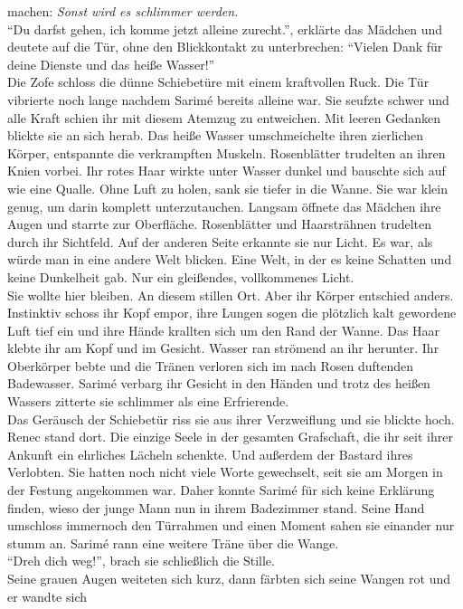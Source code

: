 machen: \textit{Sonst wird es schlimmer werden.}\\
``Du darfst gehen, ich komme jetzt alleine zurecht.'', erklärte das Mädchen und deutete auf die 
Tür, ohne den Blickkontakt zu unterbrechen: ``Vielen Dank für deine Dienste und das heiße 
Wasser!''\\
Die Zofe schloss die dünne Schiebetüre mit einem kraftvollen Ruck. Die Tür vibrierte noch lange 
nachdem Sarimé bereits alleine war. Sie seufzte schwer und alle Kraft schien ihr mit diesem Atemzug 
zu entweichen. Mit leeren Gedanken blickte sie an sich herab. Das heiße Wasser umschmeichelte ihren 
zierlichen Körper, entspannte die verkrampften Muskeln. Rosenblätter trudelten an ihren Knien 
vorbei. Ihr rotes Haar wirkte unter Wasser dunkel und bauschte sich auf wie eine Qualle. Ohne Luft 
zu holen, sank sie tiefer in die Wanne. Sie war klein genug, um darin komplett unterzutauchen. 
Langsam öffnete das Mädchen ihre Augen und starrte zur Oberfläche. Rosenblätter und Haarsträhnen 
trudelten durch ihr Sichtfeld. Auf der anderen Seite erkannte sie nur Licht. Es war, als würde man 
in eine andere Welt blicken. Eine Welt, in der es keine Schatten und keine Dunkelheit gab. Nur 
ein gleißendes, vollkommenes Licht. \\
Sie wollte hier bleiben. An diesem stillen Ort. Aber ihr Körper entschied anders. Instinktiv schoss 
ihr Kopf empor, ihre Lungen sogen die plötzlich kalt gewordene Luft tief ein und ihre Hände 
krallten sich um den Rand der Wanne. Das Haar klebte ihr am Kopf und im Gesicht. Wasser ran 
strömend an ihr herunter. Ihr Oberkörper bebte und die Tränen verloren sich im nach Rosen duftenden 
Badewasser. Sarimé verbarg ihr Gesicht in den Händen und trotz des heißen Wassers zitterte sie 
schlimmer als eine Erfrierende.\\
Das Geräusch der Schiebetür riss sie aus ihrer Verzweiflung und sie blickte hoch. Renec stand 
dort. Die einzige Seele in der gesamten Grafschaft, die ihr seit ihrer Ankunft ein ehrliches 
Lächeln schenkte. Und außerdem der Bastard ihres Verlobten. Sie hatten noch nicht viele Worte 
gewechselt, seit sie am Morgen in der Festung angekommen war. Daher konnte Sarimé für sich keine 
Erklärung finden, wieso der junge Mann nun in ihrem Badezimmer stand. Seine Hand umschloss 
immernoch den Türrahmen und einen Moment sahen sie einander nur stumm an. 
Sarimé rann eine weitere Träne über die Wange.\\
``Dreh dich weg!'', brach sie schließlich die Stille.\\
Seine grauen Augen weiteten sich kurz, dann färbten sich seine Wangen rot und er wandte sich 
